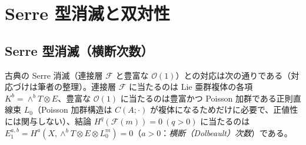 \section{Serre 型消滅と双対性}\label{sec:serre}
\subsection{Serre 型消滅（横断次数）}
古典の Serre 消滅（連接層 $\mathcal F$ と豊富な $\mathcal O(1)$）との対応は次の通りである\tK（対応づけは筆者の整理）。連接層 $\mathcal F$ に当たるのは Lie 亜群複体の各項 $K^b=\wedge^bT\otimes E$、豊富な $\mathcal O(1)$ に当たるのは豊富かつ Poisson 加群である正則直線束 $L_0$（Poisson 加群構造は $C(A;\cdot)$ が複体になるためだけに必要で、正値性には関与しない）、結論 $H^q(\mathcal F(m))=0\ (q>0)$ に当たるのは $E_1^{a,b}=H^a(X,\wedge^bT\otimes E\otimes L_0^m)=0$（$a>0$：\emph{横断（Dolbeault）次数}）である。

